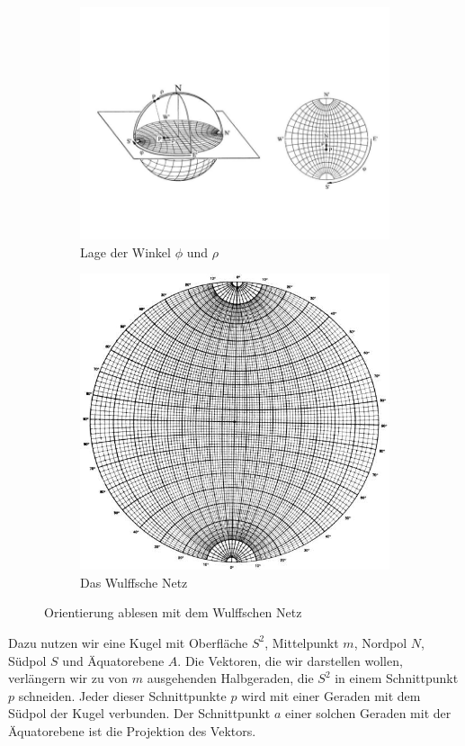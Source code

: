 \begin{figure}
	\centering
\begin{subfigure}{1\textwidth}
	\centering
	\includegraphics[width=1.1\linewidth]{./pictures/stpr4.jpg}
	\caption{Lage der Winkel $\phi$ und $\rho$}
\end{subfigure}
\begin{subfigure}{0.9\textwidth}
	\centering
	\includegraphics[width=0.8\linewidth]{./pictures/stpr5.jpg}
	\caption{Das Wulffsche Netz}
\end{subfigure}
	\caption{Orientierung ablesen mit dem Wulffschen Netz}
\end{figure}
 Dazu nutzen wir eine Kugel mit Oberfläche $S^2$, Mittelpunkt $m$, Nordpol $N$, Südpol $S$ und Äquatorebene $A$. Die Vektoren, die wir darstellen wollen, verlängern wir zu von $m$ ausgehenden Halbgeraden, die $S^2$ in einem Schnittpunkt $p$ schneiden. Jeder dieser Schnittpunkte $p$ wird mit einer Geraden mit dem Südpol der Kugel verbunden. Der Schnittpunkt $a$ einer solchen Geraden mit der Äquatorebene ist die Projektion des Vektors.
